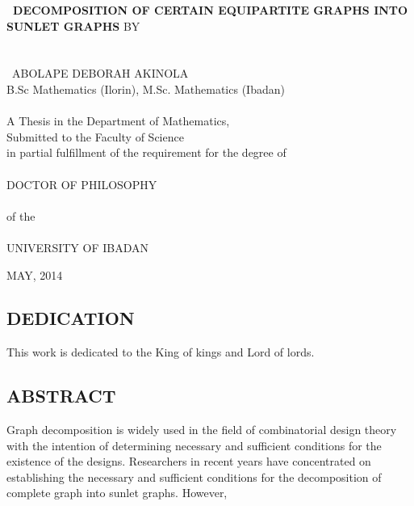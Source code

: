 \documentclass[12pt]{report}
\begin{document}
 \baselineskip 24pt
\newcommand{\disp}{\displaystyle}
\thispagestyle{empty}
\begin{center}
{\bf \ DECOMPOSITION OF CERTAIN EQUIPARTITE GRAPHS INTO SUNLET
GRAPHS } \vskip 1.0cm
BY \\
\ \\
\ \\
\ ABOLAPE DEBORAH AKINOLA\\
B.Sc Mathematics (Ilorin), M.Sc. Mathematics (Ibadan)\\
\ \\
A Thesis in the Department of Mathematics,\\
Submitted to the Faculty of Science\\
in partial fulfillment of the requirement for the degree of \\
\ \\
DOCTOR OF PHILOSOPHY\\
\ \\
of the \\
\ \\
UNIVERSITY OF IBADAN\\
\begin{flushright}
\vskip 1.8cm MAY, 2014
\end{flushright}
\end{center}
\begin{center}
\chapter*{DEDICATION}
\end{center}
This work is dedicated to the King of kings and Lord of lords.
\baselineskip 24pt
\begin{center}
\chapter*{ABSTRACT}
\end{center}
 Graph decomposition is
widely used in the field of combinatorial design theory with the
intention of determining necessary and sufficient conditions for the
existence of the designs. Researchers in recent years have
concentrated on establishing the necessary and sufficient conditions
for the decomposition of complete graph into sunlet graphs. However,
\end{document}
